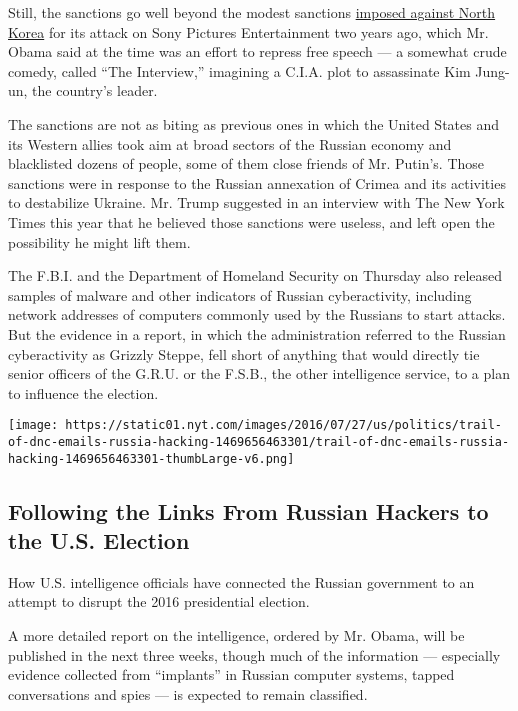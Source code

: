 Still, the sanctions go well beyond the modest sanctions
\href{http://www.nytimes.com/2015/01/03/us/in-response-to-sony-attack-us-levies-sanctions-on-10-north-koreans.html}{imposed
against North Korea} for its attack on Sony Pictures Entertainment two
years ago, which Mr. Obama said at the time was an effort to repress
free speech --- a somewhat crude comedy, called ``The Interview,''
imagining a C.I.A. plot to assassinate Kim Jung-un, the country's
leader.

The sanctions are not as biting as previous ones in which the United
States and its Western allies took aim at broad sectors of the Russian
economy and blacklisted dozens of people, some of them close friends of
Mr. Putin's. Those sanctions were in response to the Russian annexation
of Crimea and its activities to destabilize Ukraine. Mr. Trump suggested
in an interview with The New York Times this year that he believed those
sanctions were useless, and left open the possibility he might lift
them.

The F.B.I. and the Department of Homeland Security on Thursday also
released samples of malware and other indicators of Russian
cyberactivity, including network addresses of computers commonly used by
the Russians to start attacks. But the evidence in a report, in which
the administration referred to the Russian cyberactivity as Grizzly
Steppe, fell short of anything that would directly tie senior officers
of the G.R.U. or the F.S.B., the other intelligence service, to a plan
to influence the election.

\href{https://www.nytimes.com/interactive/2016/07/27/us/politics/trail-of-dnc-emails-russia-hacking.html}{}

\texttt{[image: https://static01.nyt.com/images/2016/07/27/us/politics/trail-of-dnc-emails-russia-hacking-1469656463301/trail-of-dnc-emails-russia-hacking-1469656463301-thumbLarge-v6.png]}

\hypertarget{following-the-links-from-russian-hackers-to-the-us-election}{%
\subsection{Following the Links From Russian Hackers to the U.S.
Election}\label{following-the-links-from-russian-hackers-to-the-us-election}}

How U.S. intelligence officials have connected the Russian government to
an attempt to disrupt the 2016 presidential election.

A more detailed report on the intelligence, ordered by Mr. Obama, will
be published in the next three weeks, though much of the information ---
especially evidence collected from ``implants'' in Russian computer
systems, tapped conversations and spies --- is expected to remain
classified.


